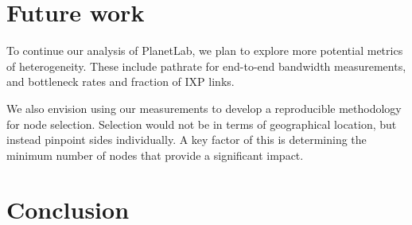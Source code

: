 \documentclass{sig-alternate-10pt}
\begin{document}
\section{Future work}

To continue our analysis of PlanetLab, we plan to explore more potential metrics
of heterogeneity. These include pathrate for end-to-end bandwidth measurements,
and bottleneck rates and fraction of IXP links. 

We also envision using our measurements to develop a reproducible methodology for
node selection. Selection would not be in terms of geographical location, but 
instead pinpoint sides individually. A key factor of this is determining the 
minimum number of nodes that  provide a significant impact.

\section{Conclusion}




\end{document}
